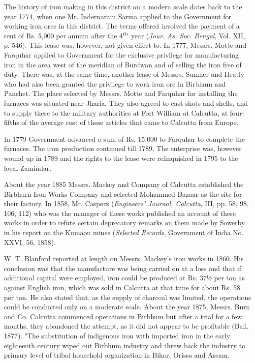 The history of iron making in this district on a modern scale dates back to the year 1774, when one Mr. Indernarain Sarma applied to the Government for working iron ores in this district. The terms offered involved the payment of a rent of Rs. 5,000 per annum after the $4^{\rm th}$ year ({\it Jour. As. Soc. Bengal}, Vol. XII, p. 546). This lease was, however, not given effect to. In 1777, Messrs. Motte and Farquhar applied to Government for the exclusive privilege for manufacturing iron in the area west of the meridian of Burdwan and of selling the iron free of duty. There was, at the same time, another lease of Messrs. Sumner and Heatly who had also been granted the privilege to work iron ore in Birbhum and Panchet. The place selected by Messrs. Motte and Farquhar for installing the furnaces was situated near Jharia. They also agreed to cast shots and shells, and to supply these to the military authorities at Fort William at Calcutta, at four-fifths of the average cost of these articles that came to Calcutta from Europe.

In 1779 Government advanced a sum of Rs. 15,000 to Farquhar to complete the furnaces.  The iron production continued till 1789.  The enterprise was, however wound up in 1789 and the rights to the lease were relinquished in 1795 to the local Zamindar.

About the year 1885 Messrs. Mackey and Company of Calcutta established the Birbhurn Iron Works Company and selected Mohammed Bazaar as the site for their factory. In 1858, Mr. Casperz ({\it Engineers’ Journal, Calcutta}, III, pp. 58, 98, 106, 112) who was the manager of these works published an account of these works in order to refute certain deprecatory remarks on them made by Sowerby in his report on the Kumaon mines ({\it Selected Records}, Government of India No. XXVI, 56, 1858).

W. T. Blanford reported at length on Messrs. Mackey’s iron works in 1860. His conclusion was that the manufacture was being carried on at a loss and that if additional capital were employed, iron could be produced at Rs. $37½$ per ton as against English iron, which was sold in Calcutta at that time for about Rs. 58 per ton. He also stated that, as the supply of charcoal was limited, the operations could be conducted only on a moderate scale. About the year 1875, Messrs. Burn and Co. Calcutta commenced operations in Birbhum but after a trial for a few months, they abandoned the attempt, as it did not appear to be profitable (Ball, 1877). "The substitution of indigenous iron with imported iron in the early eighteenth century wiped out Birbhum industry and threw back the industry to primary level of tribal household organization in Bihar, Orissa and Assam.

